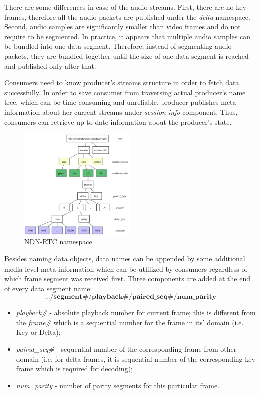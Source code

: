 \documentclass[10pt]{proc}
\begin{document}
There are some differences in case of the audio streams. First, there are no key frames, therefore all the audio packets are published under the \textit{delta} namespace. Second, audio samples are significantly smaller than video frames and do not require to be segmented. In practice, it appears that multiple audio samples can be bundled into one data segment. Therefore, instead of segmenting audio packets, they are bundled together until the size of one data segment is reached and published only after that.

Consumers need to know producer's streams structure in order to fetch data successfully. In order to save consumer from traversing actual producer's name tree, which can be time-consuming and unreliable, producer publishes meta information about her current streams under \textit{session info} component. Thus, consumers can retrieve up-to-date information about the producer's state.

\begin{figure}[Ht!]
\centering
\includegraphics[width=0.5\textwidth]{namespace}
\caption{NDN-RTC namespace}
\label{fig:namespace}
\end{figure}

Besides naming data objects, data names can be appended by some additional media-level meta information which can be utlilized by consumers regardless of which frame segment was received first. Three components are added at the end of every data segment name:
\small\begin{equation}
.../\textbf{segment\#}/\textbf{playback\#}/\textbf{paired\_seq\#}/\textbf{num\_parity} \nonumber
\end{equation}\normalsize
\begin{itemize}
\item \textit{playback\#} - absolute playback number for current frame; this is different from the \textit{frame\#} which is a sequential number for the frame in its' domain (i.e. Key or Delta);
\item \textit{paired\_seq\#} - sequential number of the corresponding frame from other domain (i.e. for delta frames, it is sequential number of the corresponding key frame which is required for decoding);
\item \textit{num\_parity} - number of parity segments for this particular frame.
\end{itemize}
\end{document}
